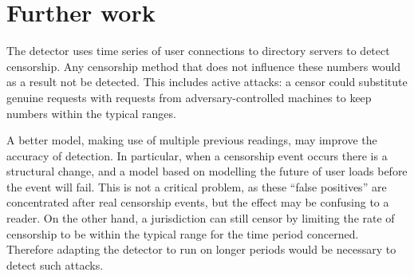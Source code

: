 \documentclass{article}
\begin{document}
\section{Further work}

The detector uses time series of user connections to directory servers to
detect censorship.
Any censorship method that does not influence these numbers would as a
result not be detected.
This includes active attacks: a censor could substitute genuine requests
with requests from adversary-controlled machines to keep numbers within
the typical ranges.

A better model, making use of multiple previous readings, may improve the
accuracy of detection.
In particular, when a censorship event occurs there is a structural
change, and a model based on modelling the future of user loads before the
event will fail.
This is not a critical problem, as these ``false positives'' are
concentrated after real censorship events, but the effect may be confusing
to a reader.
On the other hand, a jurisdiction can still censor by limiting the rate of
censorship to be within the typical range for the time period concerned.
Therefore adapting the detector to run on longer periods would be
necessary to detect such attacks.
\end{document}
